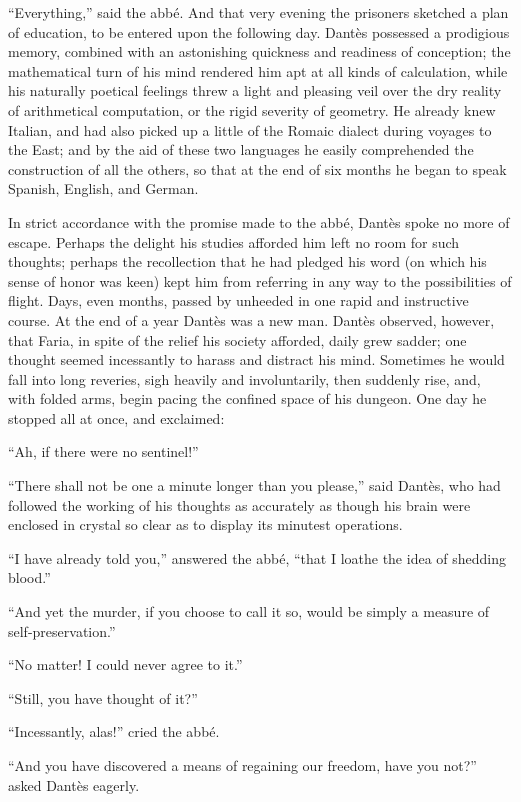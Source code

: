 “Everything,” said the abbé. And that very evening the prisoners
sketched a plan of education, to be entered upon the following day.
Dantès possessed a prodigious memory, combined with an astonishing
quickness and readiness of conception; the mathematical turn of his
mind rendered him apt at all kinds of calculation, while his naturally
poetical feelings threw a light and pleasing veil over the dry reality
of arithmetical computation, or the rigid severity of geometry. He
already knew Italian, and had also picked up a little of the Romaic
dialect during voyages to the East; and by the aid of these two
languages he easily comprehended the construction of all the others, so
that at the end of six months he began to speak Spanish, English, and
German.

In strict accordance with the promise made to the abbé, Dantès spoke no
more of escape. Perhaps the delight his studies afforded him left no
room for such thoughts; perhaps the recollection that he had pledged
his word (on which his sense of honor was keen) kept him from referring
in any way to the possibilities of flight. Days, even months, passed by
unheeded in one rapid and instructive course. At the end of a year
Dantès was a new man. Dantès observed, however, that Faria, in spite of
the relief his society afforded, daily grew sadder; one thought seemed
incessantly to harass and distract his mind. Sometimes he would fall
into long reveries, sigh heavily and involuntarily, then suddenly rise,
and, with folded arms, begin pacing the confined space of his dungeon.
One day he stopped all at once, and exclaimed:

“Ah, if there were no sentinel!”

“There shall not be one a minute longer than you please,” said Dantès,
who had followed the working of his thoughts as accurately as though
his brain were enclosed in crystal so clear as to display its minutest
operations.

“I have already told you,” answered the abbé, “that I loathe the idea
of shedding blood.”

“And yet the murder, if you choose to call it so, would be simply a
measure of self-preservation.”

“No matter! I could never agree to it.”

“Still, you have thought of it?”

“Incessantly, alas!” cried the abbé.

“And you have discovered a means of regaining our freedom, have you
not?” asked Dantès eagerly.

